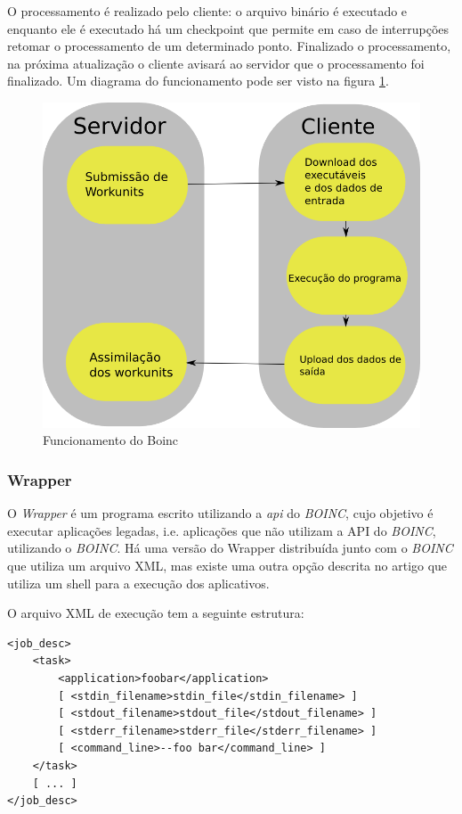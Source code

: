 O processamento é realizado pelo cliente: o arquivo binário é executado e enquanto ele é executado há um checkpoint
que permite em caso de interrupções retomar o processamento de um determinado ponto. Finalizado o processamento, 
na próxima atualização o cliente avisará ao servidor que o processamento foi finalizado. Um diagrama do funcionamento pode
ser visto na figura \ref{funcionamento-boinc}. 


\begin{figure}[!h]
  \includegraphics[scale=0.5]{boinc-schema.png}
  \caption{Funcionamento do Boinc}
  \label{funcionamento-boinc}
\end{figure}


\subsubsection{Wrapper}


O \emph{Wrapper} é um programa escrito utilizando a \emph{api} do \emph{BOINC}, cujo objetivo é executar aplicações legadas, 
i.e. aplicações que não utilizam a API do \emph{BOINC}, utilizando o \textit{BOINC}. Há uma versão do Wrapper distribuída junto com o 
\textit{BOINC} que utiliza um arquivo XML, mas existe uma outra opção descrita no artigo \cite{hungaro}
que utiliza um shell para a execução dos aplicativos.

O arquivo XML de execução tem a seguinte estrutura:

\begin{verbatim}
<job_desc>
    <task>
        <application>foobar</application>
        [ <stdin_filename>stdin_file</stdin_filename> ]
        [ <stdout_filename>stdout_file</stdout_filename> ]
        [ <stderr_filename>stderr_file</stderr_filename> ]
        [ <command_line>--foo bar</command_line> ]
    </task>
    [ ... ]
</job_desc>
\end{verbatim}

